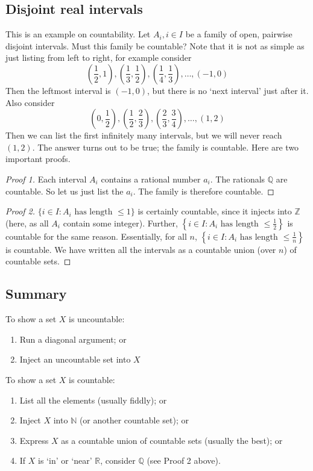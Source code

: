 \subsection{Disjoint real intervals}
This is an example on countability.
Let \(A_i, i \in I\) be a family of open, pairwise disjoint intervals.
Must this family be countable?
Note that it is not as simple as just listing from left to right, for example consider
\[
	\left(\frac{1}{2}, 1\right), \left(\frac{1}{3}, \frac{1}{2}\right), \left(\frac{1}{4}, \frac{1}{3}\right), \dots, (-1, 0)
\]
Then the leftmost interval is \((-1, 0)\), but there is no `next interval' just after it.
Also consider
\[
	\left( 0, \frac{1}{2} \right), \left( \frac{1}{2}, \frac{2}{3} \right), \left( \frac{2}{3}, \frac{3}{4} \right), \dots, (1, 2)
\]
Then we can list the first infinitely many intervals, but we will never reach \((1, 2)\).
The answer turns out to be true; the family is countable.
Here are two important proofs.
\begin{proof}[Proof 1]
	Each interval \(A_i\) contains a rational number \(a_i\).
	The rationals \(\mathbb Q\) are countable.
	So let us just list the \(a_i\).
	The family is therefore countable.
\end{proof}
\begin{proof}[Proof 2]
	\(\{ i \in I: A_i \text{ has length } \leq 1\}\) is certainly countable, since it injects into \(\mathbb Z\) (here, as all \(A_i\) contain some integer).
	Further, \(\left\{ i \in I: A_i \text{ has length } \leq \frac{1}{2} \right\}\) is countable for the same reason.
	Essentially, for all \(n\), \(\left\{ i \in I: A_i \text{ has length } \leq \frac{1}{n} \right\}\) is countable.
	We have written all the intervals as a countable union (over \(n\)) of countable sets.
\end{proof}

\subsection{Summary}
To show a set \(X\) is uncountable:
\begin{enumerate}
	\item Run a diagonal argument; or
	\item Inject an uncountable set into \(X\)
\end{enumerate}
To show a set \(X\) is countable:
\begin{enumerate}
	\item List all the elements (usually fiddly); or
	\item Inject \(X\) into \(\mathbb N\) (or another countable set); or
	\item Express \(X\) as a countable union of countable sets (usually the best); or
	\item If \(X\) is `in' or `near' \(\mathbb R\), consider \(\mathbb Q\) (see Proof 2 above).
\end{enumerate}
